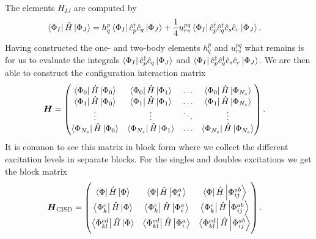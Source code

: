         The elements $H_{IJ}$ are computed by
        \begin{align}
            \bra{\Phi_I}\hat{H}\ket{\Phi_J}
            &= h^{p}_{q}
            \bra{\Phi_I}\hat{c}_{p}^{\dagger}\hat{c}_{q}\ket{\Phi_J}
            + \frac{1}{4} u^{pq}_{rs}
            \bra{\Phi_I}\hat{c}_{p}^{\dagger}\hat{c}_{q}^{\dagger}\hat{c}_{s}\hat{c}_{r}\ket{\Phi_J}.
        \end{align}
        Having constructed the one- and two-body elements $h^{p}_{q}$ and
        $u^{pq}_{rs}$ what remains is for us to evaluate the integrals
        $\bra{\Phi_I}\hat{c}_{p}^{\dagger}\hat{c}_{q}\ket{\Phi_J}$ and
        $\bra{\Phi_I}\hat{c}_{p}^{\dagger}\hat{c}_{q}^{\dagger}\hat{c}_{s}\hat{c}_{r}\ket{\Phi_J}$.
        We are then able to construct the configuration interaction matrix
        \begin{align}
            \boldsymbol{H}
            &=
            \begin{pmatrix}
                \bra{\Phi_0}\hat{H}\ket{\Phi_0} &
                \bra{\Phi_0}\hat{H}\ket{\Phi_1} &
                \dots &
                \bra{\Phi_0}\hat{H}\ket{\Phi_{N_s}} \\
                \bra{\Phi_1}\hat{H}\ket{\Phi_0} &
                \bra{\Phi_1}\hat{H}\ket{\Phi_1} &
                \dots &
                \bra{\Phi_1}\hat{H}\ket{\Phi_{N_s}} \\
                \vdots & \vdots & \ddots & \vdots \\
                \bra{\Phi_{N_s}}\hat{H}\ket{\Phi_0} &
                \bra{\Phi_{N_s}}\hat{H}\ket{\Phi_1} &
                \dots &
                \bra{\Phi_{N_s}}\hat{H}\ket{\Phi_{N_s}}
            \end{pmatrix}.
        \end{align}
        It is common to see this matrix in block form where we collect
        the different excitation levels in separate blocks.
        For the singles and doubles excitations we get the block matrix
        \begin{align}
            \boldsymbol{H}_{\text{CISD}}
            &=
            \begin{pmatrix}
                \bra{\Phi}\hat{H}\ket{\Phi} &
                \bra{\Phi}\hat{H}\ket{\Phi^{a}_{i}} &
                \bra{\Phi}\hat{H}\ket{\Phi^{ab}_{ij}} \\
                \bra{\Phi^{c}_{k}}\hat{H}\ket{\Phi} &
                \bra{\Phi^{c}_{k}}\hat{H}\ket{\Phi^{a}_{i}} &
                \bra{\Phi^{c}_{k}}\hat{H}\ket{\Phi^{ab}_{ij}} \\
                \bra{\Phi^{cd}_{kl}}\hat{H}\ket{\Phi} &
                \bra{\Phi^{cd}_{kl}}\hat{H}\ket{\Phi^{a}_{i}} &
                \bra{\Phi^{cd}_{kl}}\hat{H}\ket{\Phi^{ab}_{ij}} \\
            \end{pmatrix}.
        \end{align}


